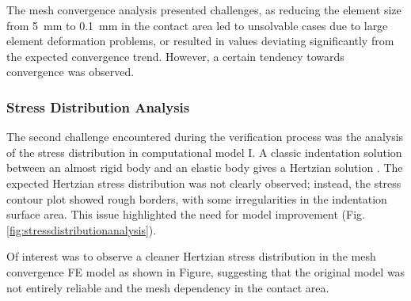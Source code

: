 The mesh convergence analysis presented challenges, as reducing the element size from \SI{5}{\milli\meter} to 
\SI{0.1}{\milli\meter} in the contact area led to unsolvable cases due to large element deformation problems, 
or resulted in values deviating significantly from the expected convergence trend. However, a certain tendency 
towards convergence was observed.

\subsubsection*{Stress Distribution Analysis}
The second challenge encountered during the verification process was the analysis of the stress distribution in 
computational model I. A classic indentation solution between an almost rigid body and an elastic body gives a Hertzian 
solution \cite{Lin2009}. The expected Hertzian stress distribution was not clearly observed; instead, the stress 
contour plot showed rough borders, with some irregularities in the indentation surface area. This issue highlighted
the need for model improvement (Fig. \ref{fig:stressdistributionanalysis}).

Of interest was to observe a cleaner Hertzian stress distribution in the mesh convergence FE model as shown in Figure, 
suggesting that the original model was not entirely reliable and the mesh dependency in the contact area.  


